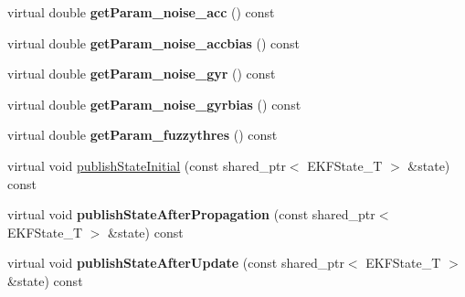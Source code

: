 \begin{DoxyCompactItemize}
\item 
\hypertarget{structmsf__core_1_1MSF__SensorManagerROS_a8832a1f48d484a04120c32bf1ffa2b63}{virtual double {\bfseries get\-Param\-\_\-noise\-\_\-acc} () const }\label{structmsf__core_1_1MSF__SensorManagerROS_a8832a1f48d484a04120c32bf1ffa2b63}

\item 
\hypertarget{structmsf__core_1_1MSF__SensorManagerROS_a73d7709e65b947e02a8080b65c6d3e7a}{virtual double {\bfseries get\-Param\-\_\-noise\-\_\-accbias} () const }\label{structmsf__core_1_1MSF__SensorManagerROS_a73d7709e65b947e02a8080b65c6d3e7a}

\item 
\hypertarget{structmsf__core_1_1MSF__SensorManagerROS_aedf81899b9210ba2d869f1b66f4e6ee0}{virtual double {\bfseries get\-Param\-\_\-noise\-\_\-gyr} () const }\label{structmsf__core_1_1MSF__SensorManagerROS_aedf81899b9210ba2d869f1b66f4e6ee0}

\item 
\hypertarget{structmsf__core_1_1MSF__SensorManagerROS_a5dad5d6ad078af02bf85ca5edd871a0b}{virtual double {\bfseries get\-Param\-\_\-noise\-\_\-gyrbias} () const }\label{structmsf__core_1_1MSF__SensorManagerROS_a5dad5d6ad078af02bf85ca5edd871a0b}

\item 
\hypertarget{structmsf__core_1_1MSF__SensorManagerROS_a40d9507b8a2a513b70078583c4851995}{virtual double {\bfseries get\-Param\-\_\-fuzzythres} () const }\label{structmsf__core_1_1MSF__SensorManagerROS_a40d9507b8a2a513b70078583c4851995}

\item 
virtual void \hyperlink{structmsf__core_1_1MSF__SensorManagerROS_abde229602f1aeb393a2aad30ef413e12}{publish\-State\-Initial} (const shared\-\_\-ptr$<$ E\-K\-F\-State\-\_\-\-T $>$ \&state) const 
\item 
\hypertarget{structmsf__core_1_1MSF__SensorManagerROS_abcf566a97988f986deb36b5c7b2d8248}{virtual void {\bfseries publish\-State\-After\-Propagation} (const shared\-\_\-ptr$<$ E\-K\-F\-State\-\_\-\-T $>$ \&state) const }\label{structmsf__core_1_1MSF__SensorManagerROS_abcf566a97988f986deb36b5c7b2d8248}

\item 
\hypertarget{structmsf__core_1_1MSF__SensorManagerROS_a612d69d5e10b3d6de0eed6e4c6720afa}{virtual void {\bfseries publish\-State\-After\-Update} (const shared\-\_\-ptr$<$ E\-K\-F\-State\-\_\-\-T $>$ \&state) const }\label{structmsf__core_1_1MSF__SensorManagerROS_a612d69d5e10b3d6de0eed6e4c6720afa}

\end{DoxyCompactItemize}
